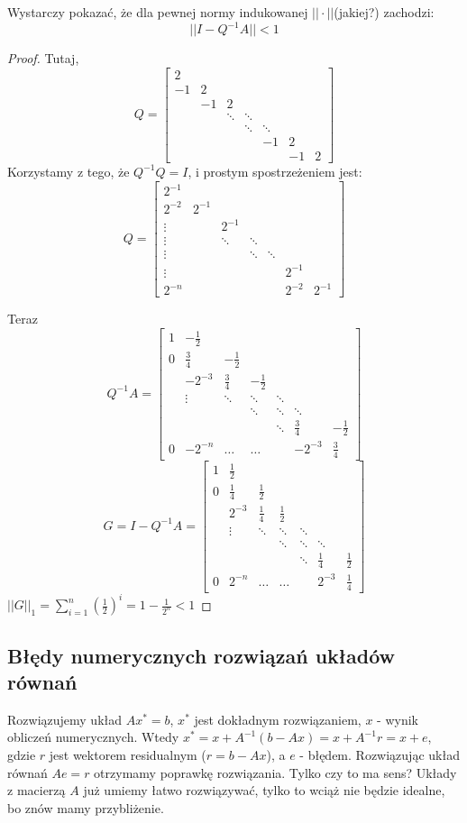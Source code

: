 \documentclass{article}
\begin{document}
Wystarczy pokazać, że dla pewnej normy indukowanej $ ||\cdot|| $(jakiej?) zachodzi: $$ ||I-Q^{-1}A ||<1$$
\begin{proof}
Tutaj, $$
Q=\begin{bmatrix}
2&&&&&\\
-1&2&&&&&\\
&-1&2&&&&\\
&&\ddots&\ddots&&&\\
&&&\ddots&\ddots&&\\
&&&&-1&2&\\
&&&&&-1&2
\end{bmatrix}
$$
Korzystamy z tego, że $ Q^{-1}Q=I $, i prostym spostrzeżeniem jest:
$$
Q=\begin{bmatrix}
2^{-1}&&&&&\\
2^{-2}&2^{-1}&&&&&\\
\vdots&&2^{-1}&&&&\\
\vdots&&\ddots&\ddots&&&\\
\vdots&&&\ddots&\ddots&&\\
\vdots&&&&&2^{-1}&\\
2^{-n}&&&&&2^{-2}&2^{-1}
\end{bmatrix}
$$

Teraz 
$$
Q^{-1}A=\begin{bmatrix}
1&-\frac12&&&&\\
0&\frac34&-\frac12&&&&\\
&-2^{-3}&\frac34&-\frac12&&&\\
&\vdots&\ddots&\ddots&\ddots&&\\
&&&\ddots&\ddots&\ddots&\\
&&&&\ddots&\frac34&-\frac12\\
0&-2^{-n}&\ldots&\ldots&&-2^{-3}&\frac34
\end{bmatrix}
$$
$$
G=I-Q^{-1}A=\begin{bmatrix}
1&\frac12&&&&\\
0&\frac14&\frac12&&&&\\
&2^{-3}&\frac14&\frac12&&&\\
&\vdots&\ddots&\ddots&\ddots&&\\
&&&\ddots&\ddots&\ddots&\\
&&&&\ddots&\frac14&\frac12\\
0&2^{-n}&\ldots&\ldots&&2^{-3}&\frac14
\end{bmatrix}
$$
$ ||G||_1=\sum_{i=1}^n(\frac12)^i=1-\frac1{2^n}<1 $
\end{proof}
\subsection{Błędy numerycznych rozwiązań układów równań}
Rozwiązujemy układ $ Ax^*=b $, $ x^* $ jest dokładnym rozwiązaniem, $ x $ - wynik obliczeń numerycznych. Wtedy $ x^*=x+A^{-1}(b-Ax)=x+A^{-1}r=x+e $, gdzie $ r $ jest wektorem residualnym ($ r=b-Ax $), a $ e $ - błędem. Rozwiązując układ równań $ Ae=r $ otrzymamy poprawkę rozwiązania. Tylko czy to ma sens? Układy z macierzą $ A $ już umiemy łatwo rozwiązywać, tylko to wciąż nie będzie idealne, bo znów mamy przybliżenie.
\end{document}
